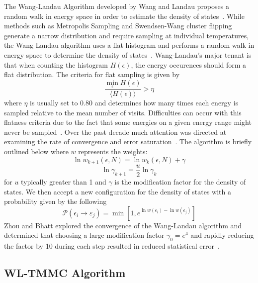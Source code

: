 \documentclass[letterpaper,twocolumn,amsmath,amssymb,pre,aps,10pt]{revtex4-1}
\begin{document}
The Wang-Landau Algorithm developed by Wang and Landau proposes a random walk in energy space in order to estimate the density of states~\cite{wang2001efficient}. While methods such as Metropolis Sampling and Swendsen-Wang cluster flipping~\cite{swendsen1987nonuniversal} generate a narrow distribution and require sampling at individual temperatures, the Wang-Landau algorithm uses a flat histogram and performs a random walk in energy space to determine the density of states~\cite{wang2001determining, landau2014guide}. Wang-Landau's major tenant is that when counting the histogram 
$H(\epsilon)$, the energy occurences should form a flat distribution.  The criteria for flat sampling is given by 
\begin{equation}
	\frac{\min_{\epsilon} H(\epsilon)}
	{\big\langle H(\epsilon)\big\rangle } 
	> \eta 
\end{equation}
where $\eta$ is usually set to $0.80$ and determines how many times each energy is sampled relative to the mean number of visits.  Difficulties can occur with this flatness criteria due to the fact that some energies on a given energy range might never be sampled~\cite{haber2014transition}.  Over the past decade much attention was directed at examining the rate of convergence and error saturation~\cite{lee2006convergence, belardinelli2007wang}.  The algorithm is briefly outlined below where $w$ represents the weights:  
\begin{equation}
	\ln{w_{k+1}(\epsilon,N)}=\ln{w_{k}(\epsilon,N)}
	+\gamma
\end{equation}
\begin{equation}
	\ln{\gamma_{k+1}}=\frac{u}{2}\ln{\gamma_{k}}
\end{equation}
for $u$ typically greater than 1 and $\gamma$ is the modification factor for
the density of states.  We then accept a new configuration for the density of 
states with a probability given by the following
\begin{equation}
	\mathcal{P}(\epsilon_i \rightarrow \varepsilon_j) 
	= \min[1,e^{\ln{w(\epsilon_i)}-\ln{w(\epsilon_j)}}]
\end{equation}
Zhou and Bhatt explored the convergence of the Wang-Landau algorithm and 
determined that choosing a large modification factor $\gamma_0 = e^{4}$ and
rapidly reducing the factor by 10 during each step resulted in reduced statistical 
error~\cite{zhou2005understanding}.


\subsection{WL-TMMC Algorithm}
\end{document}

